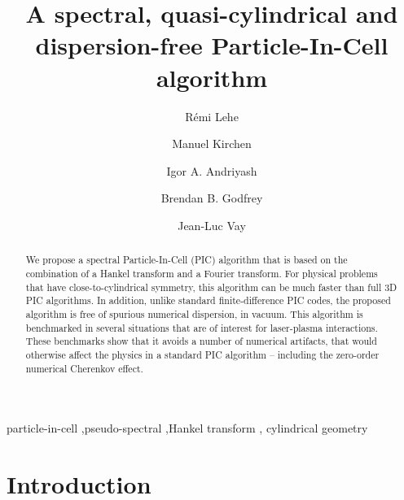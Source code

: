 \documentclass[1p,times]{elsarticle}
\begin{document}
\title{A spectral, quasi-cylindrical and dispersion-free Particle-In-Cell algorithm}
\author[label1]{R\'emi {Lehe}}
\author[label2]{Manuel {Kirchen}}
\author[label3]{Igor A. {Andriyash}}
\author[label1,label4]{Brendan B. {Godfrey}}
\author[label1]{Jean-Luc {Vay}}

\address[label1]{Lawrence Berkeley National Laboratory, Berkeley, CA 94720, USA}
\address[label2]{Center for Free-Electron Laser Science \& Department of Physics, University of Hamburg, 22761 Hamburg, Germany}
\address[label3]{LOA, ENSTA ParisTech, CNRS, \'Ecole polytechnique, Universit\'e Paris-Saclay, 828 bd des Mar\'echaux, 91762 Palaiseau c\'edex France}
\address[label4]{University of Maryland, College Park, MD 20742, USA}


\begin{abstract}
We propose a spectral Particle-In-Cell (PIC) algorithm that is based 
on the combination of a Hankel transform and a Fourier transform. 
For physical problems that have close-to-cylindrical symmetry, this
algorithm can be much faster than full 3D PIC algorithms. In addition,
unlike standard finite-difference PIC codes, the proposed algorithm is
free of spurious numerical dispersion, in vacuum. 
This algorithm is benchmarked in several situations that
are of interest for laser-plasma interactions. These
benchmarks show that it avoids a number of numerical artifacts, that
would otherwise affect the physics in a standard PIC algorithm -- 
including the zero-order numerical Cherenkov effect.
\end{abstract}

\begin{keyword}
particle-in-cell \sep pseudo-spectral \sep Hankel transform \sep
cylindrical geometry
\end{keyword}

\maketitle

\section*{Introduction}
\end{document}
